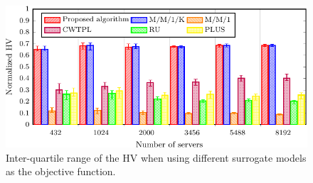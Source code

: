 


\begin{figure}[t!]
    \centering
    \includegraphics[width=\columnwidth]{graphs/model/models-crop}
    \caption{Inter-quartile range of the HV when using different surrogate models as the objective function.}
    \label{fig:model_benefits}
\end{figure}


